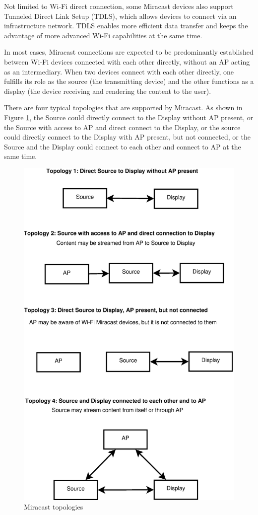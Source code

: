 Not limited to Wi-Fi direct connection, some Miracast devices also support Tunneled Direct Link Setup (TDLS), which allows devices to connect via an infrastructure network. TDLS enables more efficient data transfer and keeps the advantage of more advanced Wi-Fi capabilities at the same time.

In most cases, Miracast connections are expected to be predominantly established
between Wi-Fi devices connected with each other directly, without an AP acting
as an intermediary. When two devices connect with each other directly, one fulfills its role as the source (the transmitting device) and the other functions as a display (the device receiving and rendering the content to the user).

There are four typical topologies that are supported by Miracast. As shown in
Figure \ref{miracast_model}, the Source could directly connect to the Display
without AP present, or the Source with access to AP and direct connect to the Display, or the source could directly
connect to the Display with AP present, but not connected, or the Source and
the Display could connect to each other and connect to AP at the same time.

\begin{figure}[htb] \centering 
\hspace*{2cm} \includegraphics[width=0.9\columnwidth]{charts/miracast_model} 
\caption{Miracast topologies \label{miracast_model}} 
\end{figure} 

